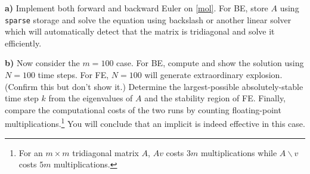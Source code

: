 \documentclass[12pt]{amsart}
\newcommand{\epart}[1]{\medskip\noindent\textbf{#1)}\quad }
\begin{document}
\epart{a}  Implement both forward and backward Euler on \eqref{mol}.  For BE, store $A$ using \texttt{sparse} storage and solve the equation using backslash or another linear solver which will automatically detect that the matrix is tridiagonal and solve it efficiently.

\epart{b}  Now consider the $m=100$ case.  For BE, compute and show the solution using $N=100$ time steps.  For FE, $N=100$ will generate extraordinary explosion.  (Confirm this but don't show it.)  Determine the largest-possible absolutely-stable time step $k$ from the eigenvalues of $A$ and the stability region of FE.  Finally, compare the computational costs of the two runs by counting floating-point multiplications.\footnote{For an $m\times m$ tridiagonal matrix $A$, $A v$ costs $3m$ multiplications while $A\backslash v$ costs $5m$ multiplications.}  You will conclude that an implicit is indeed effective in this case.
\end{document}
